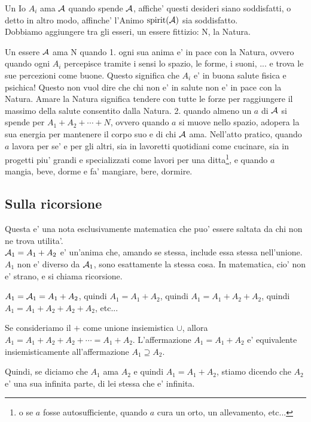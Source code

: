 Un Io $A_i$ ama $\mathcal{A}$ quando spende $\mathcal{A}$, affiche' questi desideri siano soddisfatti, o detto in altro modo, affinche' l'Animo $\textrm{spirit}(\mathcal{A})$ sia soddisfatto.\\

Dobbiamo aggiungere tra gli esseri, un essere fittizio: N, la Natura.

Un essere $\mathcal{A}$ ama N quando 1. ogni sua anima e' in pace con la Natura, ovvero quando ogni $A_i$ percepisce tramite i sensi lo spazio, le forme, i suoni, ... e trova le sue percezioni come buone. Questo significa che $A_i$ e' in buona salute fisica e psichica! Questo non vuol dire che chi non e' in salute non e' in pace con la Natura. Amare la Natura significa tendere con tutte le forze per raggiungere il massimo della salute consentito dalla Natura. 2. quando almeno un $a$ di $\mathcal{A}$ si spende per $A_1+A_2+\cdots+N$, ovvero quando $a$ si muove nello spazio, adopera la sua energia per mantenere il corpo suo e di chi $\mathcal{A}$ ama. Nell'atto pratico, quando $a$ lavora per se' e per gli altri, sia in lavoretti quotidiani come cucinare, sia in progetti piu' grandi e specializzati come lavori per una ditta\footnote{o se $a$ fosse autosufficiente, quando $a$ cura un orto, un allevamento, etc...}, e quando $a$ mangia, beve, dorme e fa' mangiare, bere, dormire. \\


\subsection{Sulla ricorsione}

Questa e' una nota esclusivamente matematica che puo' essere saltata da chi non ne trova utilita'.\\

$\mathcal{A}_1=A_1+A_2$ e' un'anima che, amando se stessa, include essa stessa nell'unione. $A_1$ non e' diverso da $\mathcal{A}_1$, sono esattamente la stessa cosa. In matematica, cio' non e' strano, e si chiama ricorsione. 

$A_1=\mathcal{A}_1=A_1+A_2$, quindi $A_1=A_1+A_2$, quindi $A_1=A_1+A_2+A_2$, quindi $A_1=A_1+A_2+A_2+A_2$, etc...

Se consideriamo il $+$ come unione insiemistica $\cup$, allora $A_1=A_1+A_2+A_2+\cdots = A_1+A_2$. L'affermazione $A_1=A_1+A_2$ e' equivalente insiemisticamente all'affermazione $A_1 \supseteq A_2$.

Quindi, se diciamo che $A_1$ ama $A_2$ e quindi $A_1=A_1+A_2$, stiamo dicendo che $A_2$ e' una sua infinita parte, di lei stessa che e' infinita.

